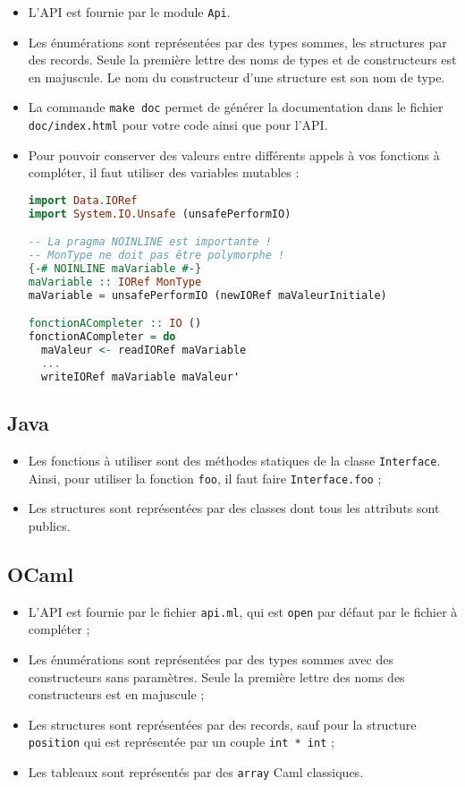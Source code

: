 \begin{itemize}
\item{L'API est fournie par le module \texttt{Api}.}
\item{Les énumérations sont représentées par des types sommes, les structures
      par des records. Seule la première lettre des noms de types et de
      constructeurs est en majuscule. Le nom du constructeur d'une structure
      est son nom de type.}
\item{La commande \texttt{make doc} permet de générer la documentation dans le
      fichier \texttt{doc/index.html} pour votre code ainsi que pour l'API.}
\item{Pour pouvoir conserver des valeurs entre différents appels à vos fonctions
      à compléter, il faut utiliser des variables mutables :}
\begin{lstlisting}[language=Haskell]
import Data.IORef
import System.IO.Unsafe (unsafePerformIO)

-- La pragma NOINLINE est importante !
-- MonType ne doit pas être polymorphe !
{-# NOINLINE maVariable #-}
maVariable :: IORef MonType
maVariable = unsafePerformIO (newIORef maValeurInitiale)

fonctionACompleter :: IO ()
fonctionACompleter = do
  maValeur <- readIORef maVariable
  ...
  writeIORef maVariable maValeur'

\end{lstlisting}
\end{itemize}

\subsection{Java}

\begin{itemize}
\item{Les fonctions à utiliser sont des méthodes statiques de la classe
      \texttt{Interface}. Ainsi, pour utiliser la fonction \texttt{foo}, il
      faut faire \texttt{Interface.foo} ;}
\item{Les structures sont représentées par des classes dont tous les attributs
      sont publics.}
\end{itemize}

\subsection{OCaml}

\begin{itemize}
\item{L'API est fournie par le fichier \texttt{api.ml}, qui est \texttt{open}
      par défaut par le fichier à compléter ;}
\item{Les énumérations sont représentées par des types sommes avec des
      constructeurs sans paramètres. Seule la première lettre des noms des
      constructeurs est en majuscule ;}
\item{Les structures sont représentées par des records, sauf pour la structure
      \texttt{position} qui est représentée par un couple \texttt{int * int} ;}
\item{Les tableaux sont représentés par des \texttt{array} Caml classiques.}
\end{itemize}

